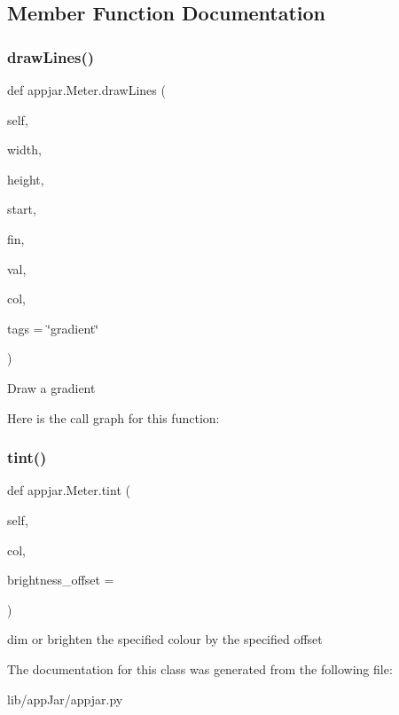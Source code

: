 \subsection{Member Function Documentation}
\mbox{\label{classappjar_1_1_meter_aed84a0393db00b8b2c15817c2e372915}} 
\subsubsection{\texorpdfstring{draw\+Lines()}{drawLines()}}
{\footnotesize\ttfamily def appjar.\+Meter.\+draw\+Lines (\begin{DoxyParamCaption}\item[{}]{self,  }\item[{}]{width,  }\item[{}]{height,  }\item[{}]{start,  }\item[{}]{fin,  }\item[{}]{val,  }\item[{}]{col,  }\item[{}]{tags = {\ttfamily \char`\"{}gradient\char`\"{}} }\end{DoxyParamCaption})}

\begin{DoxyVerb}Draw a gradient\end{DoxyVerb}
 Here is the call graph for this function\+:
\mbox{\label{classappjar_1_1_meter_aa197eb97f4f48e43d13cd224ae8a9aa0}} 
\subsubsection{\texorpdfstring{tint()}{tint()}}
{\footnotesize\ttfamily def appjar.\+Meter.\+tint (\begin{DoxyParamCaption}\item[{}]{self,  }\item[{}]{col,  }\item[{}]{brightness\+\_\+offset = {} }\end{DoxyParamCaption})}

\begin{DoxyVerb}dim or brighten the specified colour by the specified offset \end{DoxyVerb}
 

The documentation for this class was generated from the following file\+:\begin{DoxyCompactItemize}
\item 
lib/app\+Jar/appjar.\+py\end{DoxyCompactItemize}
